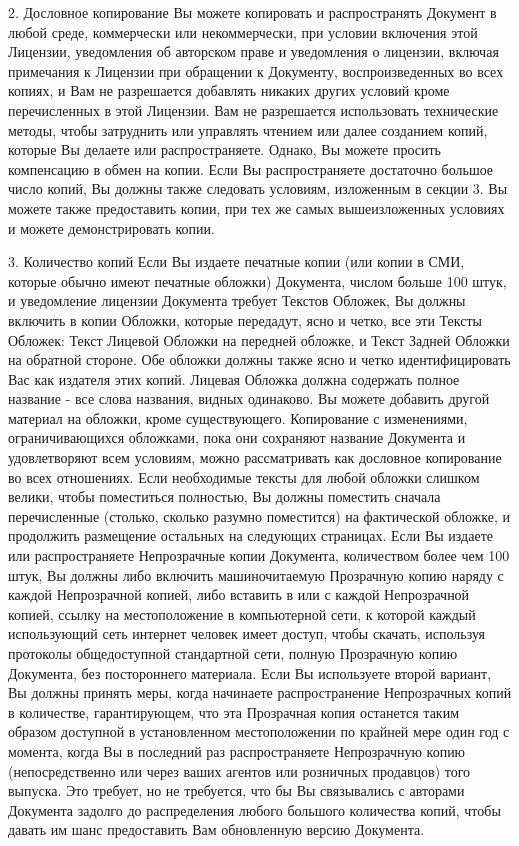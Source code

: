 2. Дословное копирование 
Вы можете копировать и распространять Документ в любой среде,  коммерчески или некоммерчески, при условии включения
 этой Лицензии, уведомления об авторском праве и уведомления о лицензии, включая примечания к Лицензии при обращении
 к Документу, воспроизведенных во всех копиях, и Вам не разрешается добавлять никаких других условий кроме перечисленных
 в этой Лицензии. Вам не разрешается использовать технические методы, чтобы затруднить или управлять чтением или далее
 созданием копий, которые Вы делаете или распространяете. Однако, Вы можете просить компенсацию в обмен на копии. Если
 Вы распространяете достаточно большое число копий, Вы должны также следовать условиям, изложенным в секции 3.
Вы можете также предоставить копии, при тех же самых вышеизложенных условиях и можете демонстрировать копии.

3. Количество копий
Если Вы издаете печатные копии (или копии в СМИ, которые обычно имеют печатные обложки) Документа, числом больше 100 штук,
 и уведомление лицензии Документа требует Текстов Обложек, Вы должны включить в копии Обложки, которые передадут, ясно и
 четко, все эти Тексты Обложек: Текст Лицевой Обложки на передней обложке, и Текст Задней Обложки на обратной стороне.
 Обе обложки должны также ясно и четко идентифицировать Вас как издателя этих копий. Лицевая Обложка должна содержать
 полное название - все слова названия, видных одинаково. Вы можете добавить другой материал на обложки, кроме существующего.
 Копирование с изменениями, ограничивающихся обложками, пока они сохраняют название Документа и удовлетворяют всем условиям,
 можно рассматривать как дословное копирование во всех отношениях.
Если необходимые тексты для любой обложки слишком велики, чтобы поместиться полностью, Вы должны поместить сначала 
перечисленные (столько, сколько разумно поместится) на фактической обложке, и продолжить размещение остальных на следующих
 страницах.
Если Вы издаете или распространяете Непрозрачные копии Документа, количеством более чем 100 штук, Вы должны либо включить
 машиночитаемую Прозрачную копию наряду с каждой Непрозрачной копией, либо вставить в или с каждой Непрозрачной копией,
 ссылку на местоположение в компьютерной сети, к которой каждый использующий сеть интернет человек имеет доступ, чтобы
 скачать, используя протоколы общедоступной стандартной сети,  полную Прозрачную копию Документа, без постороннего материала.
 Если Вы используете второй вариант, Вы должны принять меры, когда начинаете распространение Непрозрачных копий в количестве,
 гарантирующем, что эта Прозрачная копия останется таким образом доступной в установленном местоположении по крайней мере
 один год с момента, когда Вы в последний раз распространяете Непрозрачную копию (непосредственно или через ваших агентов
 или розничных продавцов) того выпуска.
Это требует, но не требуется, что бы Вы связывались с авторами Документа задолго до распределения любого большого количества
 копий, чтобы давать им шанс предоставить Вам обновленную версию Документа.

